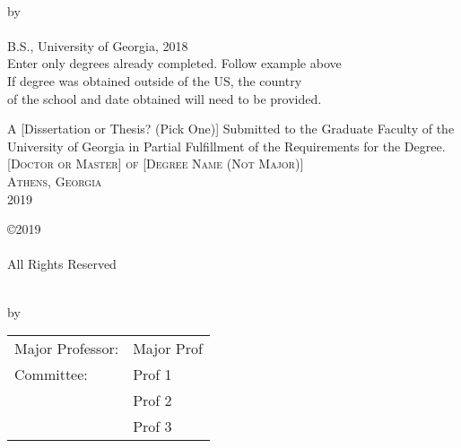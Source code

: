 \documentclass[12pt, notitlepage, twoside]{report} %
\begin{document}
\newpage
{}
\thispagestyle{empty}
\vspace*{18pt}
\begin{center}
  \textsc{\doctitle}\\[18pt]
  by\\[12pt]
  \textsc{\docauthor}\\[8pt]
  B.S., University of Georgia, 2018\\
  Enter only degrees already completed. Follow example above\\
  If degree was obtained outside of the US, the country \\
  of the school and date obtained will need to be provided.

  \vfill
  A [Dissertation or Thesis? (Pick One)] Submitted to the Graduate Faculty of the\\ University of Georgia in Partial Fulfillment of the Requirements for the Degree.\\ [18pt]

  \textsc{[Doctor or Master] of [Degree Name (Not Major)]}\\[24pt]
  \textsc{Athens, Georgia}\\[18pt]
  2019
\end{center}



\newpage
\thispagestyle{empty}
\vspace*{6.6in}
\begin{center}
  \copyright 2019\\
  \docauthor\\
  All Rights Reserved
\end{center}

\newpage
\thispagestyle{empty}
\vspace*{18pt}
\begin{center}
  \textsc{\doctitle}\\[18pt]
  by\\[18pt]
  \textsc{\docauthor}
\end{center}
\vfill

\begin{flushright}
  \begin{tabular}{ll}
    Major Professor: & Major Prof \\ [8pt]
    Committee: & Prof 1 \\
    & Prof 2 \\
    & Prof 3 \\
  \end{tabular}
\end{flushright}
\end{document}
